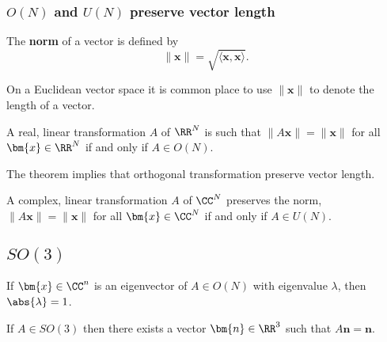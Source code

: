 \documentclass[12pt, a4paper]{article}
\begin{document}
\subsubsection{\texorpdfstring{\(O(N)\)}{TEXT} and \texorpdfstring{\(U(N)\)}{TEXT} preserve vector length}

\begin{definition}
    The \textbf{norm} of a vector is defined by 
    \[\| \bm{x} \|= \sqrt{\langle \bm{x}, \bm{x} \rangle}.\]
\end{definition}

\begin{mdnote}
    On a Euclidean vector space it is common place to use \(\| \bm{x} \|\) to denote the length of a vector.
\end{mdnote}

\begin{mdthm}
    A real, linear transformation \(A\) of \(\RR^N\) is such that \(\|A\bm{x}\| = \|\bm{x} \|\) for all \(\bm{x} \in \RR^N\) if and only if \(A \in O(N)\).
\end{mdthm}

\begin{mdnote}
    The theorem implies that orthogonal transformation preserve vector length.
\end{mdnote}

\begin{mdthm}
    A complex, linear transformation \(A\) of \(\CC^N\) preserves the norm, \(\| A\bm{x} \|=\| \bm{x} \|\) for all \(\bm{x} \in \CC^N\) if and only if \(A\in U(N)\).
\end{mdthm}

\subsection{\texorpdfstring{\(SO(3)\)}{TEXT}}

\begin{mdthm}
    If \(\bm{x} \in \CC^n\) is an eigenvector of \(A \in O(N)\) with eigenvalue \(\lambda\), then \(\abs{\lambda}=1\).
\end{mdthm}

\begin{theorem}
    If \(A \in SO(3)\) then there exists a vector \(\bm{n} \in \RR^3\) such that \(A\bm{n}=\bm{n}\).
\end{theorem}
\end{document}
